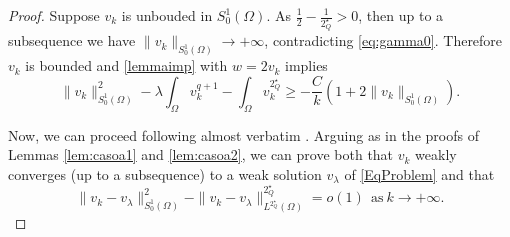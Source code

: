 \documentclass[11pt]{amsart}
\numberwithin{equation}{section} %
\theoremstyle{definition}
\newcommand{\m}{\mbox}
\begin{document}
\begin{proof}
Suppose $v_k$ is unbouded in $S^1_0(\Omega)$. As
$\frac{1}{2}-\frac{1}{2^\star_Q}>0$, 
then up to a subsequence we have
 $\|v_k\|_{S^{1}_{0}(\Omega)}\to+\infty$,
contradicting \eqref{eq:gamma0}.
Therefore $v_k$ is bounded
and \eqref{lemmaimp} with
$w=2v_k$ implies
\begin{equation}\label{eq:last}
	\|v_k\|_{S^{1}_{0}(\Omega)}^2-\lambda\int_\Omega v_k^{q+1}-\int_\Omega v_k^{2^\star_Q}\geq
	-\frac{C}{k}(1+2\|v_k\|_{S^{1}_{0}(\Omega)}).
\end{equation}

Now, we can proceed following almost verbatim \cite{BiGaVe}. Arguing as in 
the proofs of Lemmas \ref{lem:casoa1} and \ref{lem:casoa2},
we can prove both that
$v_k$ weakly converges (up to a subsequence) to a weak solution $v_\lambda$
of \eqref{EqProblem} and that
\begin{equation}\label{eq:convergence}
	\|v_k-v_\lambda\|_{S^{1}_{0}(\Omega)}^2-\|v_k-v_\lambda\|_{L^{2^\star_Q}(\Omega)}^{2^\star_Q}=o(1)\ \ \m{as}\ k\to+\infty.
\end{equation}


\end{proof}
\end{document}
